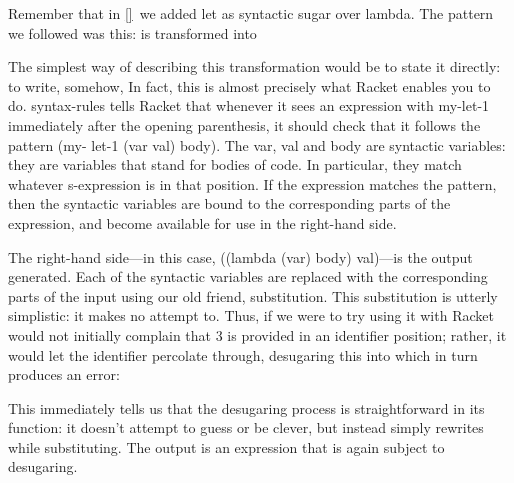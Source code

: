 
Remember that in \ref{}\ we added let as syntactic sugar over lambda. The
pattern we followed was this:
is transformed into


The simplest way of describing this transformation would be to state it
directly: to write, somehow,
In fact, this is almost precisely what Racket enables you to do.
syntax-rules tells Racket that whenever it sees an expression with my-let-1
immediately after the opening parenthesis, it should check that it follows the
pattern (my- let-1 (var val) body). The var, val and body are syntactic
variables: they are variables that stand for bodies of code. In particular, they
match whatever s-expression is in that position. If the expression matches the
pattern, then the syntactic variables are bound to the corresponding parts of
the expression, and become available for use in the right-hand side.

The right-hand side—in this case, ((lambda (var) body) val)—is the output
generated. Each of the syntactic variables are replaced with the corresponding
parts of the input using our old friend, substitution. This substitution is
utterly simplistic: it makes no attempt to. Thus, if we were to try using it
with
Racket would not initially complain that 3 is provided in an identifier
position; rather, it would let the identifier percolate through, desugaring this
into
which in turn produces an error:

This immediately tells us that the desugaring process is straightforward in its
function: it doesn’t attempt to guess or be clever, but instead simply rewrites
while substituting. The output is an expression that is again subject to
desugaring.

